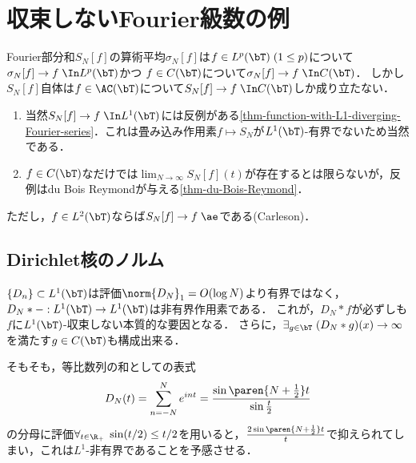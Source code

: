 \documentclass[uplatex,dvipdfmx]{jsreport}
\begin{document}
\section{収束しないFourier級数の例}

\begin{tcolorbox}[colframe=ForestGreen, colback=ForestGreen!10!white,breakable,colbacktitle=ForestGreen!40!white,coltitle=black,fonttitle=\bfseries\sffamily,
title=]
    Fourier部分和$S_N[f]$の算術平均$\sigma_N[f]$は$f\in L^p(\bT)\;(1\le p)$について$\sigma_N[f]\to f\;\In L^p(\bT)$かつ
    $f\in C(\bT)$について$\sigma_N[f]\to f\;\In C(\bT)$．
    しかし$S_N[f]$自体は$f\in\AC(\bT)$について$S_N[f]\to f\;\In C(\bT)$しか成り立たない．
    \begin{enumerate}
        \item 当然$S_N[f]\to f\;\In L^1(\bT)$には反例がある\ref{thm-function-with-L1-diverging-Fourier-series}．これは畳み込み作用素$f\mapsto S_N$が$L^1(\bT)$-有界でないため当然である．
        \item $f\in C(\bT)$なだけでは$\lim_{N\to\infty}S_N[f](t)$が存在するとは限らないが，反例はdu Bois Reymondが与える\ref{thm-du-Bois-Reymond}．
    \end{enumerate}
    ただし，$f\in L^2(\bT)$ならば$S_N[f]\to f\;\ae$である(Carleson)．
\end{tcolorbox}

\subsection{Dirichlet核のノルム}

\begin{tcolorbox}[colframe=ForestGreen, colback=ForestGreen!10!white,breakable,colbacktitle=ForestGreen!40!white,coltitle=black,fonttitle=\bfseries\sffamily,
title=]
    $\{D_n\}\subset L^1(\bT)$は評価$\norm{D_N}_1=O(\log N)$より有界ではなく，
    $D_N*-:L^1(\bT)\to L^1(\bT)$は非有界作用素である．
    これが，$D_N*f$が必ずしも$f$に$L^1(\bT)$-収束しない本質的な要因となる．
    さらに，$\exists_{g\in\bT}\;(D_N*g)(x)\to\infty$を満たす$g\in C(\bT)$も構成出来る．
\end{tcolorbox}

\begin{observation}
    そもそも，等比数列の和としての表式
    \[D_N(t)=\sum_{n=-N}^Ne^{int}=\frac{\sin\paren{N+\frac{1}{2}}t}{\sin\frac{t}{2}}\]
    の分母に評価$\forall_{t\in\R_+}\;\sin(t/2)\le t/2$を用いると，$\frac{2\sin\paren{N+\frac{1}{2}}t}{t}$で抑えられてしまい，これは$L^1$-非有界であることを予感させる．
\end{observation}
\end{document}
